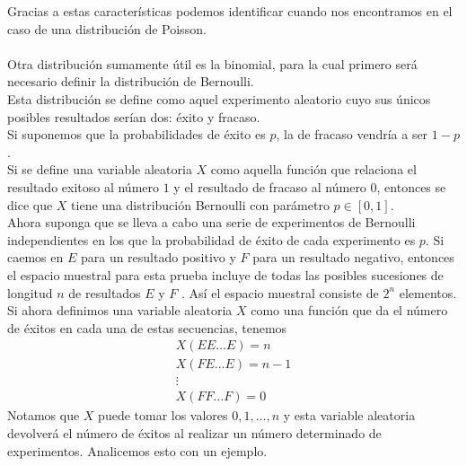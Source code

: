 Gracias a estas características podemos identificar cuando nos encontramos en el caso de una distribución de Poisson. \\\\
Otra distribución sumamente útil es la binomial, para la cual primero será necesario definir la distribución de Bernoulli.\\ Esta distribución se define como aquel experimento aleatorio cuyo sus únicos posibles resultados serían dos: éxito y fracaso.\\
Si suponemos que la probabilidades de éxito es $p$, la de fracaso vendría a ser $1-p$.\\
Si se define una variable aleatoria $X$ como aquella función que relaciona el resultado exitoso al número $1$ y el resultado de fracaso al número $0$, entonces se dice que $X$ tiene una distribución Bernoulli con parámetro $p\in[0,1]$.\\
Ahora suponga que se lleva a cabo una serie de experimentos de Bernoulli independientes en los que la probabilidad de éxito de cada experimento es $p$. Si caemos en $E$ para un resultado positivo y $F$ para un resultado negativo, entonces el espacio muestral para esta prueba incluye  de todas las posibles sucesiones de longitud $n$ de resultados $E$ y $F$ . Así el espacio muestral consiste de $2^n$ elementos.\\
Si ahora definimos una variable aleatoria $X$ como una función que da el número de éxitos en cada una de estas secuencias, tenemos
\begin{eqnarray*}
    X(E E\ldots E)=n  \\ X(FE\ldots E)=n-1\\ \vdots\\X(F F\ldots F)=0
\end{eqnarray*}
Notamos que $X$  puede tomar los valores $0,1,\ldots,n$  y esta variable aleatoria devolverá el número de éxitos al realizar un número determinado de experimentos. Analicemos esto con un ejemplo.
